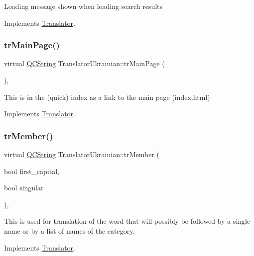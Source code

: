 Loading message shown when loading search results 

Implements \mbox{\hyperlink{class_translator}{Translator}}.

\mbox{\label{class_translator_ukrainian_a5e973b304e433fd68508913ade3e4b5d}} 
\subsubsection{\texorpdfstring{trMainPage()}{trMainPage()}}
{\footnotesize\ttfamily virtual \mbox{\hyperlink{class_q_c_string}{Q\+C\+String}} Translator\+Ukrainian\+::tr\+Main\+Page (\begin{DoxyParamCaption}{ }\end{DoxyParamCaption})\hspace{0.3cm}{\ttfamily [inline]}, {\ttfamily [virtual]}}

This is in the (quick) index as a link to the main page (index.\+html) 

Implements \mbox{\hyperlink{class_translator}{Translator}}.

\mbox{\label{class_translator_ukrainian_a278a2c7f71c00fd80294bee5299e829e}} 
\subsubsection{\texorpdfstring{trMember()}{trMember()}}
{\footnotesize\ttfamily virtual \mbox{\hyperlink{class_q_c_string}{Q\+C\+String}} Translator\+Ukrainian\+::tr\+Member (\begin{DoxyParamCaption}\item[{bool}]{first\+\_\+capital,  }\item[{bool}]{singular }\end{DoxyParamCaption})\hspace{0.3cm}{\ttfamily [inline]}, {\ttfamily [virtual]}}

This is used for translation of the word that will possibly be followed by a single name or by a list of names of the category. 

Implements \mbox{\hyperlink{class_translator}{Translator}}.

